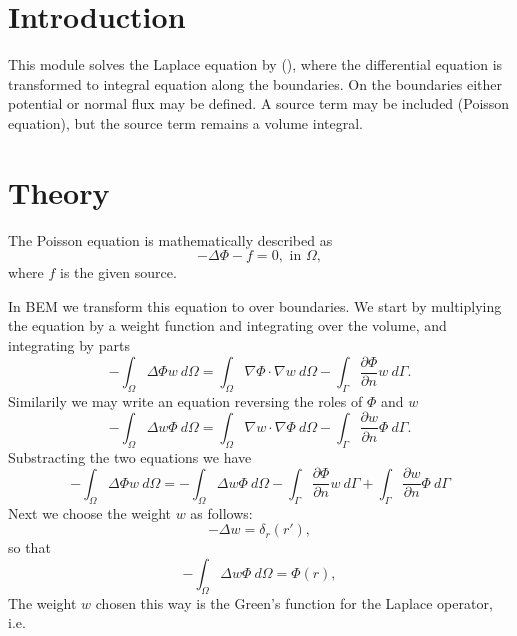 
\begin{versiona}

\section{Introduction}

This module solves the Laplace equation by  (), where
the differential equation is transformed to integral equation along the
boundaries. On the boundaries either potential or normal flux may be defined.
A source term may be included (Poisson equation), but the source term remains
a volume integral.

\section{Theory}

The Poisson equation is mathematically described as
\begin{equation}
-\Delta \Phi - f = 0, \mbox{ in } \Omega,
\end{equation}
where $f$ is the given source.

In BEM we transform this equation to  over boundaries. We start
by multiplying the equation by a weight function and integrating over the volume,
and integrating by parts
\begin{equation}
-\int_\Omega \Delta \Phi w\ d\Omega  = \int_\Omega \nabla\Phi\cdot \nabla w\ d\Omega  -
\int_\Gamma \frac{\partial\Phi}{\partial n} w\ d\Gamma.
\end{equation}
Similarily we may write an equation reversing the roles of $\Phi$ and $w$
\begin{equation}
-\int_\Omega \Delta w \Phi\ d\Omega = \int_\Omega \nabla w\cdot \nabla \Phi\ d\Omega  -
\int_\Gamma \frac{\partial w}{\partial n} \Phi\ d\Gamma.
\end{equation}
Substracting the two equations we have
\begin{equation}
-\int_\Omega \Delta \Phi w\ d\Omega =
-\int_\Omega \Delta w \Phi\ d\Omega -
\int_\Gamma \frac{\partial\Phi}{\partial n} w\ d\Gamma +
\int_\Gamma \frac{\partial w}{\partial n} \Phi\ d\Gamma
\end{equation}
Next we choose the weight $w$ as follows:
\begin{equation}
-\Delta w = \delta_r(r'),
\end{equation}
so that 
\begin{equation}
-\int_\Omega \Delta w \Phi\ d\Omega = \Phi(r), 
\end{equation}
The weight $w$ chosen this way is the Green's function for the Laplace operator,
i.e.


\end{versiona}
